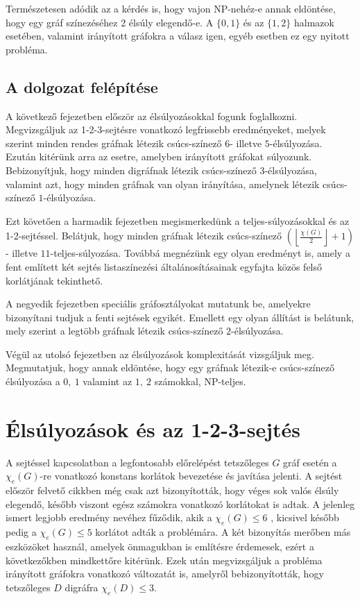 \documentclass[12pt, a4paper]{report}
\theoremstyle{remark}
\theoremstyle{definition}
\begin{document}
Természetesen adódik az a kérdés is, hogy vajon NP-nehéz-e annak eldöntése, hogy egy gráf színezéséhez 2 élsúly elegendő-e. A $\lbrace 0, 1 \rbrace$ és az $\lbrace 1, 2 \rbrace$ halmazok esetében, valamint irányított gráfokra a válasz igen, egyéb esetben ez egy nyitott probléma.

\section{A dolgozat felépítése}

A következő fejezetben először az élsúlyozásokkal fogunk foglalkozni. Megvizsgáljuk az 1-2-3-sejtésre vonatkozó legfrissebb eredményeket, melyek szerint minden rendes gráfnak létezik csúcs-színező $6$- illetve $5$-élsúlyozása. Ezután kitérünk arra az esetre, amelyben irányított gráfokat súlyozunk. Bebizonyítjuk, hogy minden digráfnak létezik csúcs-színező $3$-élsúlyozása, valamint azt, hogy minden gráfnak van olyan irányítása, amelynek létezik csúcs-színező $1$-élsúlyozása.

Ezt követően a harmadik fejezetben megismerkedünk a teljes-súlyozásokkal és az 1-2-sejtéssel. Belátjuk, hogy minden gráfnak létezik csúcs-színező $\left( \left\lfloor \frac{χ(G)}{2} \right\rfloor + 1 \right)$- illetve $11$-teljes-súlyozása. Továbbá megnézünk egy olyan eredményt is, amely a fent említett két sejtés listaszínezési általánosításainak egyfajta közös felső korlátjának tekinthető.

A negyedik fejezetben speciális gráfosztályokat mutatunk be, amelyekre bizonyítani tudjuk a fenti sejtések egyikét. Emellett egy olyan állítást is belátunk, mely szerint a legtöbb gráfnak létezik csúcs-színező $2$-élsúlyozása.

Végül az utolsó fejezetben az élsúlyozások komplexitását vizsgáljuk meg. Megmutatjuk, hogy annak eldöntése, hogy egy gráfnak létezik-e csúcs-színező élsúlyozása a $0,\ 1$ valamint az $1,\ 2$ számokkal, NP-teljes.

\chapter{Élsúlyozások és az 1-2-3-sejtés}
A sejtéssel kapcsolatban a legfontosabb előrelépést tetszőleges $G$ gráf esetén a $\chi_e(G)$-re vonatkozó konstans korlátok bevezetése és javítása jelenti. A sejtést először felvető cikkben még csak azt bizonyították, hogy véges sok valós élsúly elegendő, később viszont egész számokra vonatkozó korlátokat is adtak. A jelenleg ismert legjobb eredmény \citeauthor{Kalkowski2010} nevéhez fűződik, akik a $\chi_e(G) \leq 6$ \cite{Kalkowski2009}, kicsivel később pedig a $\chi_e(G) \leq 5$ \cite{Kalkowski2010} korlátot adták a problémára. A két bizonyítás merőben más eszközöket használ, amelyek önmagukban is említésre érdemesek, ezért a következőkben mindkettőre kitérünk. Ezek után megvizsgáljuk a probléma irányított gráfokra vonatkozó változatát is, amelyről \citeauthor{Baudon2014} \cite{Baudon2014} bebizonyították, hogy tetszőleges $D$ digráfra $\chi_e(D) \leq 3$.
\end{document}
